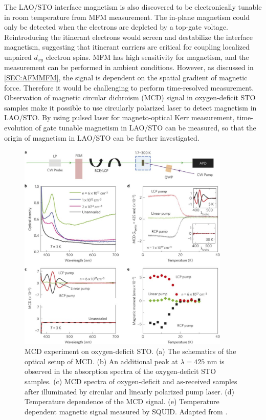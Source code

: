 \documentclass[pdflatex, sectionletters, 12pt]{pittetd}    %
\begin{document}
The LAO/STO interface magnetism is also discovered to be electronically tunable in room temperature from MFM measurement\cite{bi2014room}. The in-plane magnetism could only be detected when the electrons are depleted by a top-gate voltage. Reintroducing the itinerant electrons would screen and destabilize the interface magnetism, suggesting that itinerant carriers are critical for coupling localized unpaired $d_{xy}$ electron spins\cite{fidkowski2013magnetic, Joshua2013gate, banerjee2013ferromagnetic}. MFM has high sensitivity for magnetism, and the measurement can be performed in ambient conditions. However, as discussed in \ref{SEC:AFMMFM}, the signal is dependent on the spatial gradient of magnetic force. Therefore it would be challenging to perform time-resolved measurement. Observation of magnetic circular dichroism (MCD) signal in oxygen-deficit STO samples\cite{rice2014persistent} make it possible to use circularly polarized laser to detect magnetism in LAO/STO. By using pulsed laser for magneto-optical Kerr measurement, time-evolution of gate tunable magnetism in LAO/STO can be measured, so that the origin of magnetism in LAO/STO can be further investigated.

\begin{figure}[p]
	\centering
	\includegraphics[width=0.9\textwidth]{Drawing/MCDRice.jpg}
	\caption{MCD experiment on oxygen-deficit STO. (a) The schematics of the optical setup of MCD. (b) An additional peak at $\lambda=425$ nm is observed in the absorption spectra of the oxygen-deficit STO samples. (c) MCD spectra of oxygen-deficit and as-received samples after illuminated by circular and linearly polarized pump laser. (d) Temperature dependence of the MCD signal. (e) Temperature dependent magnetic signal measured by SQUID. Adapted from \cite{rice2014persistent}.}
	\label{FIG:MCDRice}
\end{figure}
\end{document}
